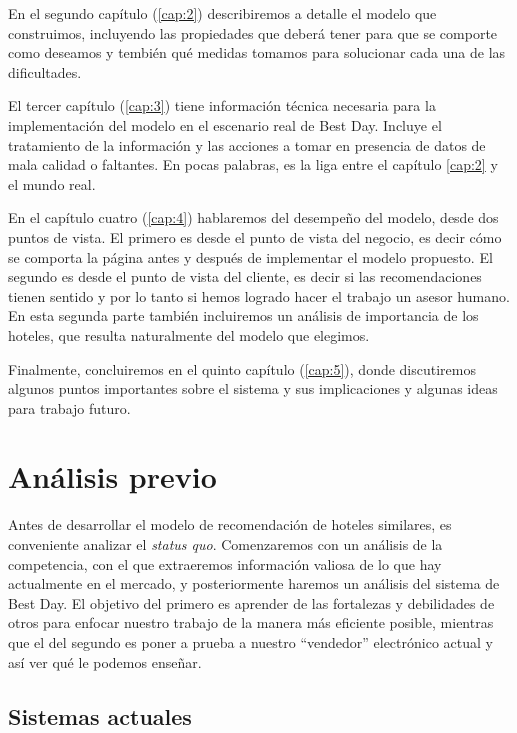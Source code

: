 \documentclass[12pt]{report}
\begin{document}
En el segundo capítulo (\ref{cap:2}) describiremos a detalle el modelo que construimos, incluyendo las propiedades que deberá tener para que se comporte como deseamos y tembién qué medidas tomamos para solucionar cada una de las dificultades.

El tercer capítulo (\ref{cap:3}) tiene información técnica necesaria para la implementación del modelo en el escenario real de Best Day. Incluye el tratamiento de la información y las acciones a tomar en presencia de datos de mala calidad o faltantes. En pocas palabras, es la liga entre el capítulo \ref{cap:2} y el mundo real.

En el capítulo cuatro (\ref{cap:4}) hablaremos del desempeño del modelo, desde dos puntos de vista. El primero es desde el punto de vista del negocio, es decir cómo se comporta la página antes y después de implementar el modelo propuesto. El segundo es desde el punto de vista del cliente, es decir si las recomendaciones tienen sentido y por lo tanto si hemos logrado hacer el trabajo un asesor humano. En esta segunda parte también incluiremos un análisis de importancia de los hoteles, que resulta naturalmente del modelo que elegimos.

Finalmente, concluiremos en el quinto capítulo (\ref{cap:5}), donde discutiremos algunos puntos importantes sobre el sistema y sus implicaciones y algunas ideas para trabajo futuro.

\chapter{Análisis previo} \label{cap:1}

Antes de desarrollar el modelo de recomendación de hoteles similares, es conveniente analizar el \emph{status quo}. Comenzaremos con un análisis de la competencia, con el que extraeremos información valiosa de lo que hay actualmente en el mercado, y posteriormente haremos un análisis del sistema de Best Day. El objetivo del primero es aprender de las fortalezas y debilidades de otros para enfocar nuestro trabajo de la manera más eficiente posible, mientras que el del segundo es poner a prueba a nuestro ``vendedor'' electrónico actual y así ver qué le podemos enseñar.

\section{Sistemas actuales}
\end{document}
